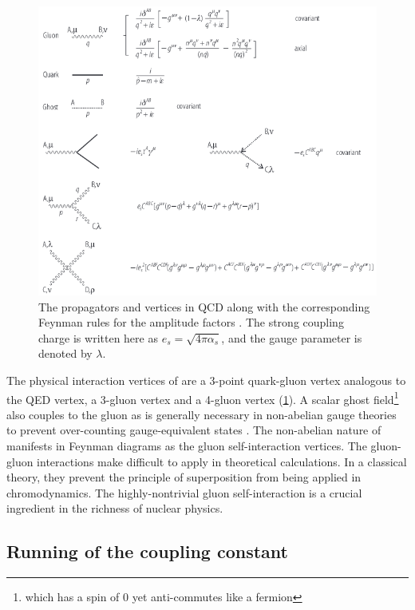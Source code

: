 \begin{figure}[t]
  \includegraphics{qcd_feynman.png}
  \caption{The propagators and vertices in QCD along with the corresponding Feynman rules for the amplitude factors \cite{Altarelli:2013tya}. The strong coupling charge is written here as $e_s = \sqrt{4\pi\alpha_s}$, and the gauge parameter is denoted by $\lambda$.}
  \label{fig:qcd_feynman}
\end{figure}

The physical interaction vertices of \qcd are a 3-point quark-gluon vertex analogous to the \ac{QED} vertex, a 3-gluon vertex and a 4-gluon vertex (\cref{fig:qcd_feynman}).
A scalar ghost field\footnote{which has a spin of 0 yet anti-commutes like a fermion} also couples to the gluon as is generally necessary in non-abelian gauge theories to prevent over-counting gauge-equivalent states \cite{Faddeev:1967fc}.
The non-abelian nature of \qcd manifests in Feynman diagrams as the gluon self-interaction vertices.
The gluon-gluon interactions make \qcd difficult to apply in theoretical calculations.
In a classical theory, they prevent the principle of superposition from being applied in chromodynamics.
The highly-nontrivial gluon self-interaction is a crucial ingredient in the richness of nuclear physics.


\subsection{Running of the coupling constant} %

